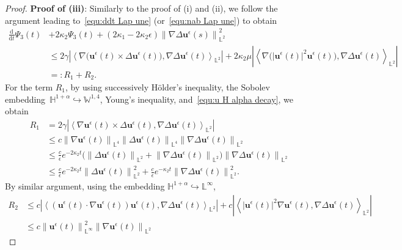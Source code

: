 \documentclass[11pt,reqno]{amsart}
\theoremstyle{definition}
\numberwithin{equation}{section}
\newcommand{\bff}{\boldsymbol}
\newcommand{\bb}{\mathbb}
\newcommand{\ddt}{\frac{\mathrm{d}}{\mathrm{d}t}}
\newcommand{\nn}{\nonumber}
\newcommand{\norm}[2]{\left\|{#1}\right\|_{#2}}
\newcommand{\inpro}[2]{\left\langle#1,#2\right\rangle}
\begin{document}
\begin{proof}
	\medskip
	\noindent
	\textbf{Proof of (iii)}:
	Similarly to the proof of (i) and (ii), we follow the argument leading
	to~\eqref{equ:ddt Lap une} (or~\eqref{equ:nab Lap une}) to obtain
	\begin{align*}
		\ddt \Psi_3(t)
		&+
		2 \kappa_2 \Psi_3(t)
		+ 
		(2\kappa_1-2\kappa_2 \epsilon) \norm{\nabla \Delta \bff{u}^\epsilon(s)}{\bb{L}^2}^2
		\nn \\
		&\leq
		2\gamma
		\left|\inpro{\nabla\Big(\bff{u}^\epsilon(t)\times\Delta\bff{u}^\epsilon(t)\Big)}
		{\nabla\Delta\bff{u}^\epsilon(t)}_{\bb{L}^2}\right|
		+ 2\kappa_2\mu
		\left|
		\inpro{\nabla\Big(|\bff{u}^\epsilon(t)|^2\bff{u}^\epsilon(t)\Big)}
		{\nabla\Delta\bff{u}^\epsilon(t)}_{\bb{L}^2}
		\right|
		\nn \\
		&=: R_1+R_2.
	\end{align*}
	For the term $R_1$, by using successively H\"older's inequality, the Sobolev
	embedding~$\bb{H}^{1+\alpha} \hookrightarrow \bb{W}^{1,4}$, Young's inequality, and~\eqref{equ:u H alpha decay}, we obtain
	\begin{align*}
		R_1
		&=
		2\gamma 
		\left| 
		\inpro{\nabla \bff{u}^\epsilon(t) \times \Delta \bff{u}^\epsilon(t)}
		{\nabla \Delta \bff{u}^\epsilon(t)}_{\bb{L}^2} 
		\right| 
		\\
		&\leq
		c
		\norm{\nabla \bff{u}^\epsilon(t)}{\bb{L}^4} 
		\norm{\Delta \bff{u}^\epsilon(t)}{\bb{L}^4} 
		\norm{\nabla \Delta \bff{u}^\epsilon(t)}{\bb{L}^2}
		\\
		&\leq
		\frac{c}{\epsilon}e^{-2\kappa_2 t} \big(\norm{\Delta \bff{u}^\epsilon(t)}{\bb{L}^2} + \norm{\nabla\Delta \bff{u}^\epsilon(t)}{\bb{L}^2} \big) \norm{\nabla\Delta \bff{u}^\epsilon(t)}{\bb{L}^2}
		\\
		&\leq
		\frac{c}{\epsilon}e^{-2\kappa_2 t}
		\norm{\Delta \bff{u}^\epsilon(t)}{\bb{L}^2}^2
		+
		\frac{c}{\epsilon}e^{-\kappa_2 t} 
		\norm{\nabla \Delta \bff{u}^\epsilon(t)}{\bb{L}^2}^2.
	\end{align*}
	By similar argument, using the embedding $\bb{H}^{1+\alpha}\hookrightarrow \bb{L}^\infty$,
	\begin{align*}
		R_2
		&\leq
		c 
		\left| 
		\inpro{(\bff{u}^\epsilon(t)\cdot \nabla \bff{u}^\epsilon(t)) \bff{u}^\epsilon(t)}
		{\nabla\Delta \bff{u}^\epsilon(t)}_{\bb{L}^2} 
		\right| 
		+
		c 
		\left| 
		\inpro{|\bff{u}^\epsilon(t)|^2 \nabla \bff{u}^\epsilon(t)}
		{\nabla \Delta \bff{u}^\epsilon(t)}_{\bb{L}^2} 
		\right| 
		\\
		&\leq
		c 
		\norm{\bff{u}^\epsilon(t)}{\bb{L}^\infty}^2 
		\norm{\nabla \bff{u}^\epsilon(t)}{\bb{L}^2} 

\end{align*}
\end{proof}
\end{document}
